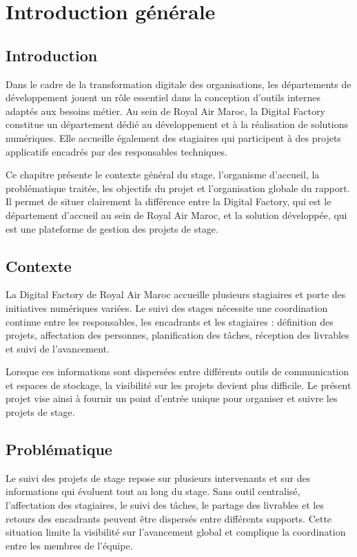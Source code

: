 \chapter{Introduction générale}

\section{Introduction}
Dans le cadre de la transformation digitale des organisations, les départements de développement jouent un rôle essentiel dans la conception d'outils internes adaptés aux besoins métier. Au sein de Royal Air Maroc, la Digital Factory constitue un département dédié au développement et à la réalisation de solutions numériques. Elle accueille également des stagiaires qui participent à des projets applicatifs encadrés par des responsables techniques.

Ce chapitre présente le contexte général du stage, l'organisme d'accueil, la problématique traitée, les objectifs du projet et l'organisation globale du rapport. Il permet de situer clairement la différence entre la Digital Factory, qui est le département d'accueil au sein de Royal Air Maroc, et la solution développée, qui est une plateforme de gestion des projets de stage.

\section{Contexte}
La Digital Factory de Royal Air Maroc accueille plusieurs stagiaires et porte des initiatives numériques variées. Le suivi des stages nécessite une coordination continue entre les responsables, les encadrants et les stagiaires : définition des projets, affectation des personnes, planification des tâches, réception des livrables et suivi de l'avancement.

Lorsque ces informations sont dispersées entre différents outils de communication et espaces de stockage, la visibilité sur les projets devient plus difficile. Le présent projet vise ainsi à fournir un point d'entrée unique pour organiser et suivre les projets de stage.

\section{Problématique}
Le suivi des projets de stage repose sur plusieurs intervenants et sur des informations qui évoluent tout au long du stage. Sans outil centralisé, l'affectation des stagiaires, le suivi des tâches, le partage des livrables et les retours des encadrants peuvent être dispersés entre différents supports. Cette situation limite la visibilité sur l'avancement global et complique la coordination entre les membres de l'équipe.

